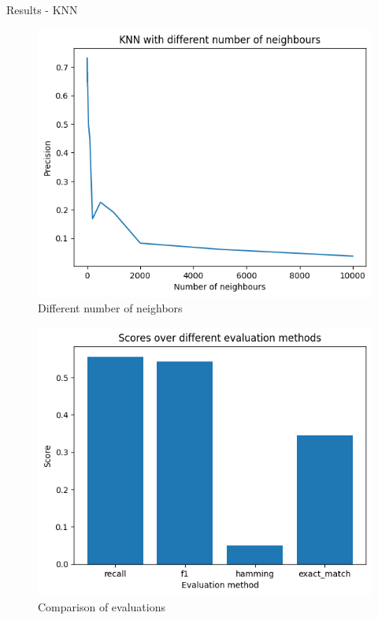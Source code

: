\documentclass{beamer}
\begin{document}
\begin{frame}[t]{Results - KNN}
 {
	\vspace{-3mm}
	\begin{figure}[h]
		\caption{Different number of neighbors}
		\centering
		\includegraphics[width=0.73\linewidth]{images/KNN/f1_score_over_k_large.png}
	\end{figure}
}

\pause
{} {
	\vspace{-3mm}
	\begin{figure}[h]
		\caption{Comparison of evaluations}
		\centering
		\includegraphics[width=0.73\linewidth]{images/KNN/score_every_eval.png}
	\end{figure}
}
\end{frame}
\end{document}
